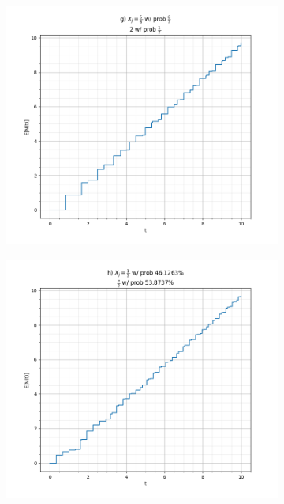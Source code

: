 \documentclass[a4paper]{article}
\begin{document}
\begin{itemize}
\begin{figure} [t]
\begin{subfigure}[b]{0.45\textwidth}
                \includegraphics[width=1\linewidth]{src/g.png}
            \end{subfigure}
            \begin{subfigure}[b]{0.45\textwidth}
                \includegraphics[width=1\linewidth]{src/h.png}
            \end{subfigure}
        \end{figure}
\end{itemize}
\end{document}
